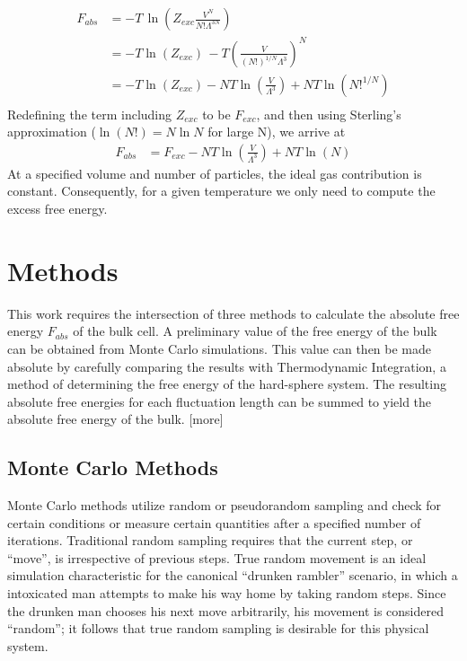 \documentclass[12pt]{article}
\begin{document}
\begin{align}
    F_{abs} &= -T\,\ln\left(Z_{exc} \frac{V^N}{N!\Lambda^{3N}}\right)\\
    &= -T\ln\left(Z_{exc}\right)\, -T\left(\frac{V}{(N!)^{1/N}\Lambda^3} \right)^N\\
    &= -T\ln\left(Z_{exc}\right) - NT\ln\left(\frac{V}{\Lambda^3}\right) + NT\ln\left(N!^{1/N}\right)\\ 
\end{align}
Redefining the term including $Z_{exc}$ to be $F_{exc}$, and then using Sterling's approximation ($\ln(N!) = N\ln N$ for large N), we arrive at
\begin{align}
    F_{abs} &= F_{exc} - NT\ln\left(\frac{V}{\Lambda^3}\right) + NT\ln\left(N\right)
\end{align}
At a specified volume and number of particles, the ideal gas contribution is constant. Consequently, for a given temperature we only need to compute the excess free energy.

\section{Methods}
This work requires the intersection of three methods to calculate the absolute free energy $F_{abs}$ of the bulk cell. A preliminary value of the free energy of the bulk can be obtained from Monte Carlo simulations. This value can then be made absolute by carefully comparing the results with Thermodynamic Integration, a method of determining the  free energy of the hard-sphere system. The resulting absolute free energies for each fluctuation length can be summed to yield the absolute free energy of the bulk. [more] 

\subsection{Monte Carlo Methods}

Monte Carlo methods utilize random or pseudorandom sampling and check for certain conditions or measure certain quantities after a specified number of iterations. Traditional random sampling requires that the current step, or ``move'', is irrespective of previous steps. True random movement is an ideal simulation characteristic for the canonical ``drunken rambler'' scenario, in which a intoxicated man attempts to make his way home by taking random steps. Since the drunken man chooses his next move arbitrarily, his movement is considered ``random''; it follows that true random sampling is desirable for this physical system. \\
\end{document}
